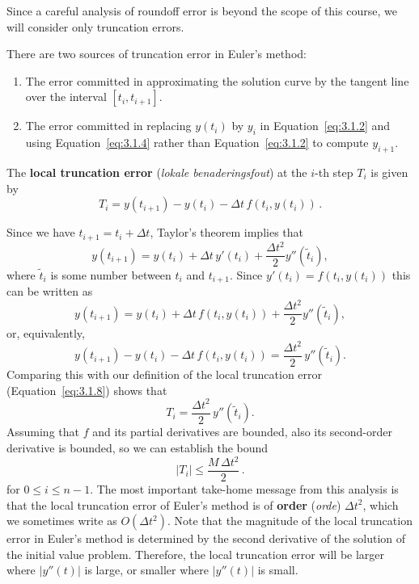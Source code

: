 Since a careful analysis of roundoff error is beyond the scope of this course, we will consider only truncation errors.

There are two sources of truncation error in Euler's method:
\begin{enumerate}
\item The error committed in approximating the solution curve by the tangent line  over the interval $[t_i,t_{i+1}]$.
\item The error committed in replacing $y(t_i)$ by $y_i$ in Equation~\eqref{eq:3.1.2} and using Equation~\eqref{eq:3.1.4} rather than Equation~\eqref{eq:3.1.2} to compute $y_{i+1}$.
 \end{enumerate}

The \textbf{local truncation error} (\textit{lokale benaderingsfout}) at the $i$-th step $T_i$ is given by
\begin{equation} \label{eq:3.1.8}
T_i=y(t_{i+1})-y(t_i)-\Delta t\,f(t_i,y(t_i))\,.
\end{equation}
 
Since we have $t_{i+1}=t_i+\Delta t$, Taylor's theorem implies that
$$
y(t_{i+1})=y(t_i)+\Delta t\,y'(t_i)+\dfrac{\Delta t^2}{2}y''(\tilde t_i),
$$
where $\tilde t_i$ is some number between $t_i$ and $t_{i+1}$.
Since $y'(t_i)=f(t_i,y(t_i))$  this can be written as
$$
y(t_{i+1})=y(t_i)+\Delta t\,f(t_i,y(t_i))+\dfrac{\Delta t^2}{2}y''(\tilde t_i),
$$
or, equivalently,
$$
y(t_{i+1})-y(t_i)-\Delta t\,f(t_i,y(t_i))=\dfrac{\Delta t^2}{2}\,y''(\tilde t_i).
$$
Comparing this with our definition of the local truncation error (Equation~\eqref{eq:3.1.8}) shows that
$$
T_i=\dfrac{\Delta t^2}{2}\,y''(\tilde t_i).
$$
Assuming that $f$ and its partial derivatives are bounded, also its second-order derivative is bounded, so we can establish the bound
\begin{equation} \label{eq:3.1.10}
|T_i|\le\dfrac{M\,\Delta t^2}{2}\,.
\end{equation}
for $0\le i\le n-1$. The most important take-home message from this analysis is that the local truncation error of Euler's method is of \textbf{order} (\textit{orde}) $\Delta t^2$, which we sometimes write as $O\left(\Delta t^2\right)$. Note that the magnitude of the local truncation error in
Euler's method is determined by the second derivative of the solution of the initial value problem. Therefore, the local truncation error will be larger where $|y''(t)|$ is large, or smaller where $|y''(t)|$ is small.



